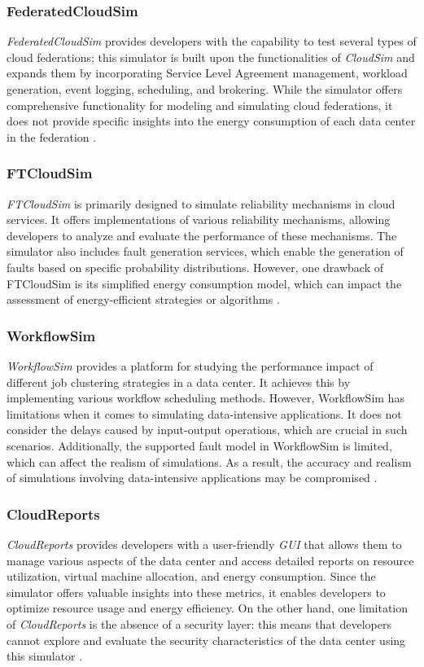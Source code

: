 {\subsubsection*{FederatedCloudSim}
\emph{FederatedCloudSim} \cite{kohne2014federatedcloudsim} provides developers with the capability to test several types of cloud federations; this simulator is built upon the functionalities of \emph{CloudSim} and expands them by incorporating Service Level Agreement management, workload generation, event logging, scheduling, and brokering. While the simulator offers comprehensive functionality for modeling and simulating cloud federations, it does not provide specific insights into the energy consumption of each data center in the federation \cite{mansouri2020cloud}.
\subsubsection*{FTCloudSim}
\emph{FTCloudSim} \cite{zhou2013ftcloudsim} is primarily designed to simulate reliability mechanisms in cloud services. It offers implementations of various reliability mechanisms, allowing developers to analyze and evaluate the performance of these mechanisms. The simulator also includes fault generation services, which enable the generation of faults based on specific probability distributions. However, one drawback of FTCloudSim is its simplified energy consumption model, which can impact the assessment of energy-efficient strategies or algorithms \cite{mansouri2020cloud}.
\subsubsection*{WorkflowSim}
\emph{WorkflowSim} \cite{chen2012workflowsim} provides a platform for studying the performance impact of different job clustering strategies in a data center. It achieves this by implementing various workflow scheduling methods. However, WorkflowSim has limitations when it comes to simulating data-intensive applications. It does not consider the delays caused by input-output operations, which are crucial in such scenarios. Additionally, the supported fault model in WorkflowSim is limited, which can affect the realism of simulations. As a result, the accuracy and realism of simulations involving data-intensive applications may be compromised \cite{mansouri2020cloud}. 
\subsubsection*{CloudReports}
\emph{CloudReports} \cite{teixeira2014cloudreports} provides developers with a user-friendly \emph{GUI} that allows them to manage various aspects of the data center and access detailed reports on resource utilization, virtual machine allocation, and energy consumption. Since the simulator offers valuable insights into these metrics, it enables developers to optimize resource usage and energy efficiency.
On the other hand, one limitation of \emph{CloudReports} is the absence of a security layer: this means that developers cannot explore and evaluate the security characteristics of the data center using this simulator \cite{mansouri2020cloud}.
}
